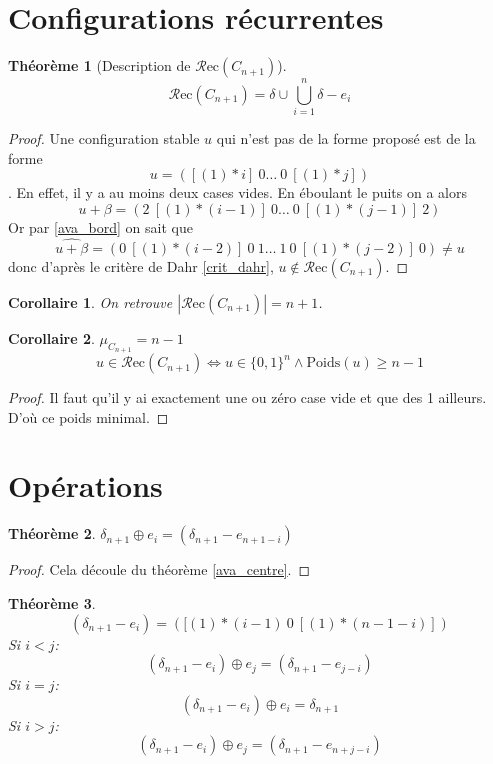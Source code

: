 \documentclass{report}
\newtheorem{theorem}{Théorème}[chapter]
\newtheorem{corollary}{Corollaire}[theorem]
\newcommand{\poids}[1]{\ensuremath{\text{Poids}(#1)}}
\newcommand{\recu}[1]{\ensuremath{\mathcal{R}\text{ec}(#1)}}
\newcommand{\poidsmin}[1]{\ensuremath{\mu_{#1}}}
\newcommand{\stab}[1]{\ensuremath{\widehat{#1}}}
\newcommand{\plus}{\ensuremath{\oplus}}
\newcommand{\card}[1]{\ensuremath{|#1|}}
\begin{document}
\section{Configurations récurrentes}
\begin{theorem}[Description de \recu{C_{n+1}}]
$$\recu{C_{n+1}} = \delta \cup \bigcup_{i=1}^{n} \delta - e_i  $$
\end{theorem}
\begin{proof}
Une configuration stable $u$ qui n'est pas de la forme proposé est de la forme $$u = ([(1) * i] \ 0 \hdots \ 0 \ [(1) * j])$$. En effet, il y a au moins deux cases vides. En éboulant le puits on a alors $$u + \beta = (2\ [(1) * (i-1)] \ 0 \hdots \ 0 \ [(1) * (j-1)]\ 2)$$ Or par \ref{ava_bord} on sait que $$\stab{u + \beta} = (0\ [(1) * (i-2)] \ 0 \ 1 \hdots\ 1 \ 0 \ [(1) * (j-2)]\ 0) \not= u$$ donc d'après le critère de Dahr \ref{crit_dahr}, $u\not\in\recu{C_{n+1}} $.
\end{proof}
\begin{corollary} 
On retrouve $\card{\recu{C_{n+1}}} = n+1$.
\end{corollary}

\begin{corollary}\label{critere_cn}  $\poidsmin{C_{n+1}} = n - 1$
$$u \in \recu{C_{n+1}} \Leftrightarrow u \in \{0, 1\}^{n} \land \poids{u}\geq n - 1 $$
\end{corollary}
\begin{proof}
Il faut qu'il y ai exactement une ou zéro case vide et que des 1 ailleurs. D'où ce poids minimal.
\end{proof}

\section{Opérations}
\begin{theorem} \label{d+e}
$\delta_{n+1} \plus e_i = (\delta_{n+1} - e_{n+1-i})$
\end{theorem}

\begin{proof}
Cela découle du théorème \ref{ava_centre}. 
\end{proof}

\begin{theorem} \label{d-e+e}
$$(\delta_{n+1} - e_i) = ([(1) * (i - 1)\ 0\ [(1) * (n - 1 - i)])$$
Si $i < j$:
$$(\delta_{n+1} - e_i) \plus e_j = (\delta_{n+1} - e_{j-i})$$
Si $i = j$:
$$(\delta_{n+1} - e_i) \plus e_i = \delta_{n+1}$$
Si $i > j$:
$$(\delta_{n+1} - e_i) \plus e_j = (\delta_{n+1} - e_{n +j-i})$$
\end{theorem}
\end{document}
